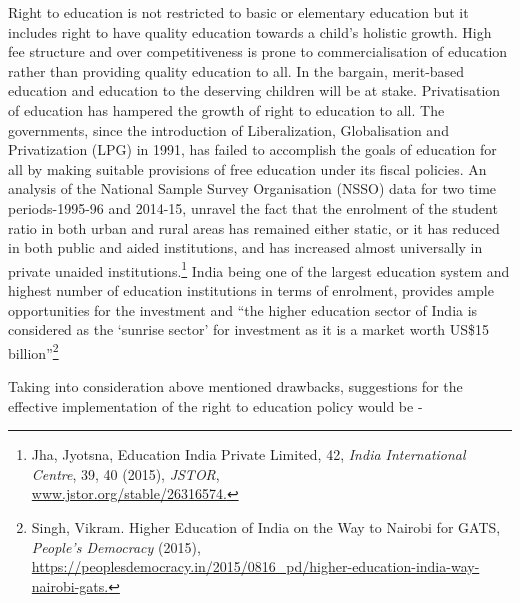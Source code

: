 \begin{multicols}{2}
\vspace{-.1cm}


\vspace{-.1cm}

\noi
Right to education is not restricted to basic or elementary education but it includes right to
have quality education towards a child’s holistic growth. High fee structure and over
competitiveness is prone to commercialisation of education rather than providing quality
education to all. In the bargain, merit-based education and education to the deserving children
will be at stake. Privatisation of education has hampered the growth of right to education to
all. The governments, since the introduction of Liberalization, Globalisation and Privatization
(LPG) in 1991, has failed to accomplish the goals of education for all by making suitable
provisions of free education under its fiscal policies. An analysis of the National Sample
Survey Organisation (NSSO) data for two time periods-1995-96 and 2014-15, unravel the
fact that the enrolment of the student ratio in both urban and rural areas has remained either
static, or it has reduced in both public and aided institutions, and has increased almost
universally in private unaided institutions.\footnote{Jha, Jyotsna, Education India Private Limited, 42, \textit{India International Centre}, 39, 40 (2015), \textit{JSTOR},\\ \url{www.jstor.org/stable/26316574.}} India being one of the largest education system and highest number of education institutions in terms of enrolment, provides ample
opportunities for the investment and “the higher education sector of India is considered as the
‘sunrise sector’ for investment as it is a market worth US\$15 billion”\footnote{Singh, Vikram. Higher Education of India on the Way to Nairobi for GATS, \textit{People’s Democracy} (2015),\\ \url{https://peoplesdemocracy.in/2015/0816_pd/higher-education-india-way-nairobi-gats.}}


\vspace{-.1cm}


\vspace{-.05cm}

\noi
Taking into consideration above mentioned drawbacks, suggestions for the effective
implementation of the right to education policy would be -


\end{multicols}

